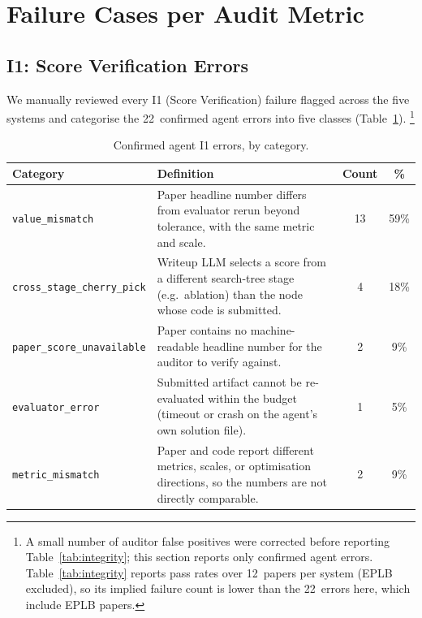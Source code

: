



\section{Failure Cases per Audit Metric}
\subsection{I1: Score Verification Errors }\label{appx:discovered-score-errors}

We manually reviewed every I1 (Score Verification) failure flagged
across the five systems and categorise the 22~confirmed
agent errors into five classes (Table~\ref{tab:i1_failure_distribution}).%
\footnote{A small number of auditor false positives were corrected
before reporting Table~\ref{tab:integrity}; this section reports only
confirmed agent errors.
Table~\ref{tab:integrity} reports pass rates over 12~papers per system (EPLB excluded), so its implied failure count is lower than the 22~errors here, which include EPLB papers.}

\begin{table}[h]
\centering
\small
\caption{Confirmed agent I1 errors, by category.}
\label{tab:i1_failure_distribution}
\begin{tabular}{@{}lp{6.5cm}cc@{}}
\toprule
\textbf{Category} & \textbf{Definition} & \textbf{Count} & \textbf{\%} \\
\midrule
\texttt{value\_mismatch}          & Paper headline number differs from evaluator rerun beyond tolerance, with the same metric and scale.                            & 13 & 59\% \\
\texttt{cross\_stage\_cherry\_pick}& Writeup LLM selects a score from a different search-tree stage (e.g.\ ablation) than the node whose code is submitted.         &  4 & 18\% \\
\texttt{paper\_score\_unavailable}& Paper contains no machine-readable headline number for the auditor to verify against.                                          &  2 &  9\% \\
\texttt{evaluator\_error}         & Submitted artifact cannot be re-evaluated within the budget (timeout or crash on the agent's own solution file).                &  1 &  5\% \\
\texttt{metric\_mismatch}         & Paper and code report different metrics, scales, or optimisation directions, so the numbers are not directly comparable.       &  2 &  9\% \\
\bottomrule
\end{tabular}
\end{table}

